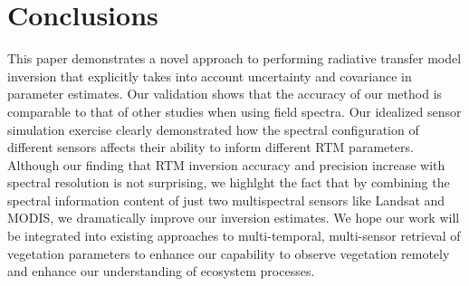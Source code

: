 \section{Conclusions} \label{s:conclusions} 

This paper demonstrates a novel approach to performing radiative transfer
model inversion that explicitly takes into account uncertainty and covariance
in parameter estimates. Our validation shows that the accuracy of our method
is comparable to that of other studies when using field spectra. Our idealized
sensor simulation exercise clearly demonstrated how the spectral configuration
of different sensors affects their ability to inform different RTM parameters.
Although our finding that RTM inversion accuracy and precision increase with
spectral resolution is not surprising, we highlght the fact that by combining
the spectral information content of just two multispectral sensors like
Landsat and MODIS, we dramatically improve our inversion estimates. We hope
our work will be integrated into existing approaches to multi-temporal,
multi-sensor retrieval of vegetation parameters to enhance our capability to
observe vegetation remotely and enhance our understanding of ecosystem
processes.
